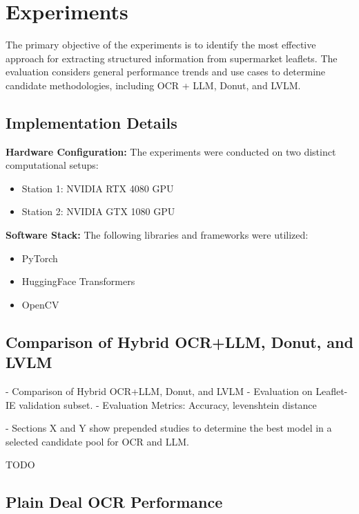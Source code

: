 \documentclass[11pt]{article}
\begin{document}

\section{Experiments}

The primary objective of the experiments is to identify the most effective approach for extracting structured information from supermarket leaflets. The evaluation considers general performance trends and use cases to determine candidate methodologies, including OCR + LLM, Donut, and LVLM.



\subsection{Implementation Details}

\textbf{Hardware Configuration:} The experiments were conducted on two distinct computational setups:
\begin{itemize}
    \item Station 1: NVIDIA RTX 4080 GPU
    \item Station 2: NVIDIA GTX 1080 GPU
\end{itemize}

\textbf{Software Stack:} The following libraries and frameworks were utilized:
\begin{itemize}
    \item PyTorch
    \item HuggingFace Transformers
    \item OpenCV
\end{itemize}


\subsection{Comparison of Hybrid OCR+LLM, Donut, and LVLM}
- Comparison of Hybrid OCR+LLM, Donut, and LVLM
- Evaluation on Leaflet-IE validation subset.
- Evaluation Metrics: Accuracy, levenshtein distance

- Sections X and Y show prepended studies to determine the best model in a selected candidate pool for OCR and LLM.

TODO

\subsection{Plain Deal OCR Performance}
\end{document}
